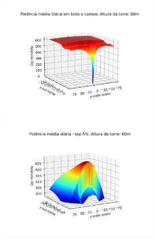 \documentclass[12pt,notheorems,hyperref={pdfauthor=Professor Rafael Nardi}]{beamer}
\begin{document}
\begin{frame}%
	\begin{figure}[htpb]
		\centering
		\includegraphics[width=0.7\textwidth]{../../plots/tower_shadow_correction/square_grid_along_day_60mfull_grid.png}
		\label{fig:heliost_field_average_60m_top5}
	\end{figure}
\end{frame}

\begin{frame}%
	\begin{figure}[htpb]
		\centering
		\includegraphics[width=0.7\textwidth]{../../plots/tower_shadow_correction/square_grid_along_day_60mtop_5_most_powerfull.png}
		\label{fig:heliost_field_average_60m}
	\end{figure}
\end{frame}
\end{document}
